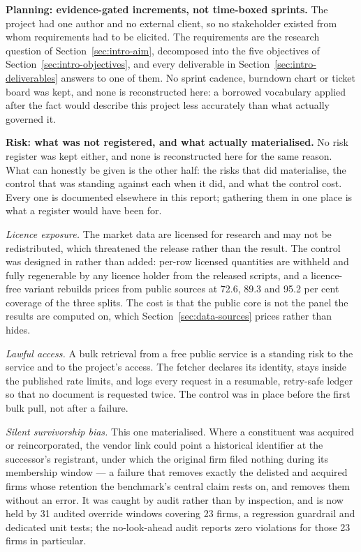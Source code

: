 \textbf{Planning: evidence-gated increments, not time-boxed sprints.} The
project had one author and no external client, so no stakeholder existed from
whom requirements had to be elicited. The requirements are the research question
of Section~\ref{sec:intro-aim}, decomposed into the five objectives of
Section~\ref{sec:intro-objectives}, and every deliverable in
Section~\ref{sec:intro-deliverables} answers to one of them. No sprint cadence,
burndown chart or ticket board was kept, and none is reconstructed here: a
borrowed vocabulary applied after the fact would describe this project less
accurately than what actually governed it.

\textbf{Risk: what was not registered, and what actually materialised.} No risk
register was kept either, and none is reconstructed here for the same reason.
What can honestly be given is the other half: the risks that did materialise,
the control that was standing against each when it did, and what the control
cost. Every one is documented elsewhere in this report; gathering them in one
place is what a register would have been for.

\emph{Licence exposure.} The market data are licensed for research and may not
be redistributed, which threatened the release rather than the result. The
control was designed in rather than added: per-row licensed quantities are
withheld and fully regenerable by any licence holder from the released scripts,
and a licence-free variant rebuilds prices from public sources at 72.6, 89.3 and
95.2 per cent coverage of the three splits. The cost is that the public core is
not the panel the results are computed on, which
Section~\ref{sec:data-sources} prices rather than hides.

\emph{Lawful access.} A bulk retrieval from a free public service is a standing
risk to the service and to the project's access. The fetcher declares its
identity, stays inside the published rate limits, and logs every request in a
resumable, retry-safe ledger so that no document is requested twice. The control
was in place before the first bulk pull, not after a failure.

\emph{Silent survivorship bias.} This one materialised. Where a constituent was
acquired or reincorporated, the vendor link could point a historical identifier
at the successor's registrant, under which the original firm filed nothing
during its membership window --- a failure that removes exactly the delisted and
acquired firms whose retention the benchmark's central claim rests on, and
removes them without an error. It was caught by audit rather than by inspection,
and is now held by 31 audited override windows covering 23 firms, a regression
guardrail and dedicated unit tests; the no-look-ahead audit reports zero
violations for those 23 firms in
particular. %

